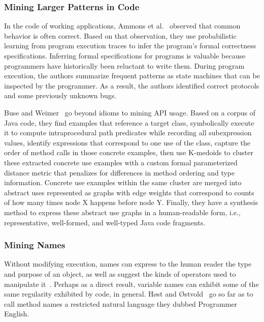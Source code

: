\subsubsection{Mining Larger Patterns in Code}

In the code of working applications, Ammons et al.~\cite{ammons2002mining} observed that common behavior is often correct. Based on that observation, they use probabilistic learning from program execution traces to infer the program's formal correctness specifications. Inferring formal specifications for programs is valuable because programmers have historically been reluctant to write them. During program execution, the authors summarize frequent patterns as state machines that can be inspected by the programmer. As a result, the authors identified correct protocols and some previously unknown bugs.

Buse and Weimer~\cite{buse2012synthesizing} go beyond idioms to mining API usage. Based on a corpus of Java code, they find examples that reference a target class, symbolically execute it to compute intraprocedural path predicates while recording all subexpression values, identify expressions that correspond to one use of the class, capture the order of method calls in those concrete examples, then use K-medoids to cluster these extracted concrete use examples with a custom formal parameterized distance metric that penalizes for differences in method ordering and type information. Concrete use examples within the same cluster are merged into abstract uses represented as graphs with edge weights that correspond to counts of how many times node X happens before node Y. Finally, they have a synthesis method to express these abstract use graphs in a human-readable form, i.e., representative, well-formed, and well-typed Java code fragments.

\subsubsection{Mining Names}

Without modifying execution, names can express to the human reader the type and purpose of an object, as well as suggest the kinds of operators used to manipulate it~\cite{jones2008operand}. Perhaps as a direct result, variable names can exhibit some of the same regularity exhibited by code, in general. H{{\o{}}}st and {{\O{}}}stvold~\cite{host2008java} go so far as to call method names a restricted natural language they dubbed Programmer English.

